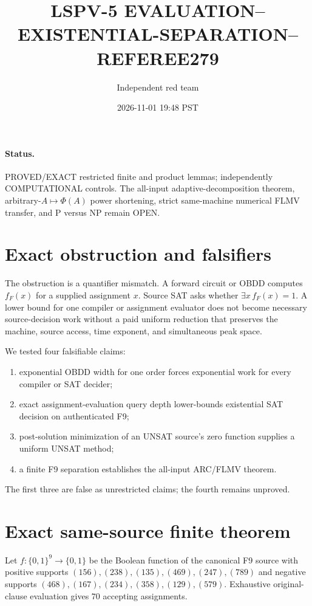 \documentclass[11pt]{article}
\title{LSPV-5 EVALUATION--EXISTENTIAL-SEPARATION--REFEREE279}
\author{Independent red team}
\date{2026-11-01 19:48 PST}
\begin{document}
\maketitle

\paragraph{Status.}
PROVED/EXACT restricted finite and product lemmas; independently COMPUTATIONAL controls.
The all-input adaptive-decomposition theorem, arbitrary-$A\mapsto\Phi(A)$ power shortening,
strict same-machine numerical FLMV transfer, and P versus NP remain OPEN.

\section{Exact obstruction and falsifiers}

The obstruction is a quantifier mismatch.  A forward circuit or OBDD computes
$f_F(x)$ for a supplied assignment $x$.  Source SAT asks whether
$\exists x\,f_F(x)=1$.  A lower bound for one compiler or assignment evaluator does not
become necessary source-decision work without a paid uniform reduction that preserves the
machine, source access, time exponent, and simultaneous peak space.

We tested four falsifiable claims:
\begin{enumerate}
\item exponential OBDD width for one order forces exponential work for every compiler or SAT decider;
\item exact assignment-evaluation query depth lower-bounds existential SAT decision on authenticated F9;
\item post-solution minimization of an UNSAT source's zero function supplies a uniform UNSAT method;
\item a finite F9 separation establishes the all-input ARC/FLMV theorem.
\end{enumerate}
The first three are false as unrestricted claims; the fourth remains unproved.

\section{Exact same-source finite theorem}

Let $f:\{0,1\}^9\to\{0,1\}$ be the Boolean function of the canonical F9 source with
positive supports
$(156),(238),(135),(469),(247),(789)$ and negative supports
$(468),(167),(234),(358),(129),(579)$.  Exhaustive original-clause evaluation gives
$70$ accepting assignments.
\end{document}

